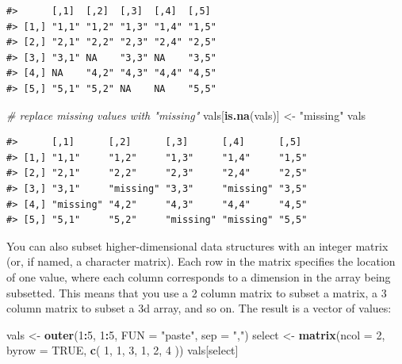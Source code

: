 \documentclass[]{book}
\newenvironment{Shaded}{\begin{snugshade}}{\end{snugshade}}
\newcommand{\KeywordTok}[1]{\textcolor[rgb]{0.13,0.29,0.53}{\textbf{#1}}}
\newcommand{\DataTypeTok}[1]{\textcolor[rgb]{0.13,0.29,0.53}{#1}}
\newcommand{\DecValTok}[1]{\textcolor[rgb]{0.00,0.00,0.81}{#1}}
\newcommand{\StringTok}[1]{\textcolor[rgb]{0.31,0.60,0.02}{#1}}
\newcommand{\CommentTok}[1]{\textcolor[rgb]{0.56,0.35,0.01}{\textit{#1}}}
\newcommand{\OtherTok}[1]{\textcolor[rgb]{0.56,0.35,0.01}{#1}}
\newcommand{\OperatorTok}[1]{\textcolor[rgb]{0.81,0.36,0.00}{\textbf{#1}}}
\newcommand{\NormalTok}[1]{#1}
\theoremstyle{definition}
\theoremstyle{definition}
\theoremstyle{definition}
\theoremstyle{remark}
\begin{document}
\begin{verbatim}
#>      [,1]  [,2]  [,3]  [,4]  [,5] 
#> [1,] "1,1" "1,2" "1,3" "1,4" "1,5"
#> [2,] "2,1" "2,2" "2,3" "2,4" "2,5"
#> [3,] "3,1" NA    "3,3" NA    "3,5"
#> [4,] NA    "4,2" "4,3" "4,4" "4,5"
#> [5,] "5,1" "5,2" NA    NA    "5,5"
\end{verbatim}

\begin{Shaded}
\begin{Highlighting}[]
\CommentTok{# replace missing values with "missing"}
\NormalTok{vals[}\KeywordTok{is.na}\NormalTok{(vals)] <-}\StringTok{ "missing"}
\NormalTok{vals}
\end{Highlighting}
\end{Shaded}

\begin{verbatim}
#>      [,1]      [,2]      [,3]      [,4]      [,5] 
#> [1,] "1,1"     "1,2"     "1,3"     "1,4"     "1,5"
#> [2,] "2,1"     "2,2"     "2,3"     "2,4"     "2,5"
#> [3,] "3,1"     "missing" "3,3"     "missing" "3,5"
#> [4,] "missing" "4,2"     "4,3"     "4,4"     "4,5"
#> [5,] "5,1"     "5,2"     "missing" "missing" "5,5"
\end{verbatim}

You can also subset higher-dimensional data structures with an integer
matrix (or, if named, a character matrix). Each row in the matrix
specifies the location of one value, where each column corresponds to a
dimension in the array being subsetted. This means that you use a 2
column matrix to subset a matrix, a 3 column matrix to subset a 3d
array, and so on. The result is a vector of values:

\begin{Shaded}
\begin{Highlighting}[]
\NormalTok{vals <-}\StringTok{ }\KeywordTok{outer}\NormalTok{(}\DecValTok{1}\OperatorTok{:}\DecValTok{5}\NormalTok{, }\DecValTok{1}\OperatorTok{:}\DecValTok{5}\NormalTok{, }\DataTypeTok{FUN =} \StringTok{"paste"}\NormalTok{, }\DataTypeTok{sep =} \StringTok{","}\NormalTok{)}
\NormalTok{select <-}\StringTok{ }\KeywordTok{matrix}\NormalTok{(}\DataTypeTok{ncol =} \DecValTok{2}\NormalTok{, }\DataTypeTok{byrow =} \OtherTok{TRUE}\NormalTok{, }\KeywordTok{c}\NormalTok{(}
  \DecValTok{1}\NormalTok{, }\DecValTok{1}\NormalTok{,}
  \DecValTok{3}\NormalTok{, }\DecValTok{1}\NormalTok{,}
  \DecValTok{2}\NormalTok{, }\DecValTok{4}
\NormalTok{))}
\NormalTok{vals[select]}
\end{Highlighting}
\end{Shaded}
\end{document}
